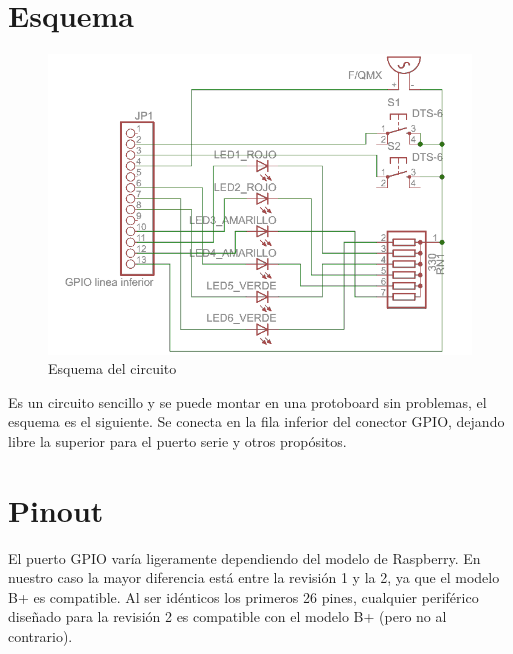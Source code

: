 
\pagestyle{fancy}
\fancyhead[LE,RO]{\thepage}
\fancyhead[LO]{\nouppercase{\rightmark}}

\label{chp:PlacaAux}
\minitoc

\section{Esquema}

\begin{figure}[h]
  \centering
    \includegraphics[width=14cm]{graphs/circuito.png}
  \caption{Esquema del circuito}
  \label{fig:circuito}
\end{figure}

Es un circuito sencillo y se puede montar en una protoboard sin
problemas, el esquema es el siguiente. Se conecta en la fila
inferior del conector GPIO, dejando libre la superior para el puerto
serie y otros propósitos.

\section{Pinout}

El puerto GPIO varía ligeramente dependiendo del modelo de Raspberry. En nuestro caso
la mayor diferencia está entre la revisión 1 y la 2, ya que el modelo B+ es compatible.
Al ser idénticos los primeros 26 pines, cualquier periférico diseñado para la revisión 2
es compatible con el modelo B+ (pero no al contrario).


